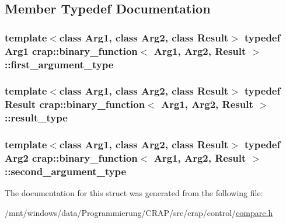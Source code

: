 \subsection{Member Typedef Documentation}
\hypertarget{structcrap_1_1binary__function_a9a31c99ac4accfc4336f5fcdd0f32c9f}{
\subsubsection[{first\-\_\-argument\-\_\-type}]{\setlength{\rightskip}{0pt plus 5cm}template$<$class Arg1, class Arg2, class Result$>$ typedef Arg1 {\bf crap\-::binary\-\_\-function}$<$ Arg1, Arg2, Result $>$\-::{\bf first\-\_\-argument\-\_\-type}}}\label{structcrap_1_1binary__function_a9a31c99ac4accfc4336f5fcdd0f32c9f}
\hypertarget{structcrap_1_1binary__function_a20fc043232aebcb7c1cacf6ed3cdca25}{
\subsubsection[{result\-\_\-type}]{\setlength{\rightskip}{0pt plus 5cm}template$<$class Arg1, class Arg2, class Result$>$ typedef Result {\bf crap\-::binary\-\_\-function}$<$ Arg1, Arg2, Result $>$\-::{\bf result\-\_\-type}}}\label{structcrap_1_1binary__function_a20fc043232aebcb7c1cacf6ed3cdca25}
\hypertarget{structcrap_1_1binary__function_ad778fde23d6c8d56c4e969eeae910211}{
\subsubsection[{second\-\_\-argument\-\_\-type}]{\setlength{\rightskip}{0pt plus 5cm}template$<$class Arg1, class Arg2, class Result$>$ typedef Arg2 {\bf crap\-::binary\-\_\-function}$<$ Arg1, Arg2, Result $>$\-::{\bf second\-\_\-argument\-\_\-type}}}\label{structcrap_1_1binary__function_ad778fde23d6c8d56c4e969eeae910211}


The documentation for this struct was generated from the following file\-:\begin{DoxyCompactItemize}
\item 
/mnt/windows/data/\-Programmierung/\-C\-R\-A\-P/src/crap/control/\hyperlink{compare_8h}{compare.\-h}\end{DoxyCompactItemize}
